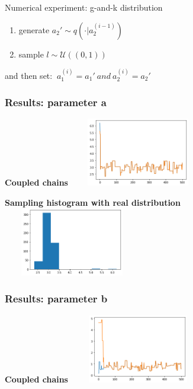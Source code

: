 \documentclass{beamer}
\begin{document}
\begin{section}{Numerical experiment: g-and-k distribution}
\begin{frame}
		\begin{enumerate}
		\item generate $ a_{2}' \sim q( \cdot |a_{2}^{(i-1)} ) $
		
		\item sample $ l \sim \mathcal{U}((0,1)) $
	\end{enumerate}
	and then set:   $ \ a_{1}^{(i)}=a_{1}' \ and \ a_{2}^{(i)}= a_{2}'$
	

\end{frame}


\begin{frame}
	\frametitle{Results: parameter a}
	\begin{center}
		\begin{minipage}{0.63\textwidth}
			\begin{center}
				{\scriptsize \textbf{Coupled chains}}
				\includegraphics[width=6cm,height=3cm]{immagini_mario/a_chains}
			\end{center}
		\end{minipage}
		
		\vspace{0.2cm}
		
		\begin{minipage}{0.63\textwidth}
			\begin{center}
				{\scriptsize \textbf{Sampling histogram with real distribution}}
				\includegraphics[width=6cm,height=3cm]{immagini_mario/a_hist}
			\end{center}
		\end{minipage}
	\end{center}
\end{frame}

\begin{frame}
	\frametitle{Results: parameter b}
	\begin{center}
		\begin{minipage}{0.63\textwidth}
			\begin{center}
				{\scriptsize \textbf{Coupled chains}}
				\includegraphics[width=6cm,height=3cm]{immagini_mario/b_chains}
			\end{center}
		\end{minipage}
		

\end{center}
\end{frame}
\end{section}
\end{document}

